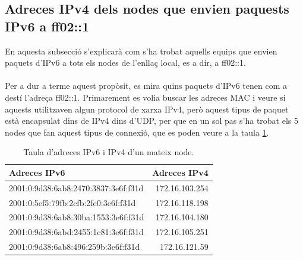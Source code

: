 \documentclass{article}
\begin{document}
\subsection{Adreces IPv4 dels nodes que envien paquests IPv6 a ff02::1}
En aquesta subsecció s'explicarà com s'ha trobat aquells equips que envien
paquets d'IPv6 a tots els nodes de l'enllaç local, es a dir, a ff02::1.\\
\\
Per a dur a terme aquest propòsit, es mira quins paquets d'IPv6 tenen com
a destí l'adreça ff02::1. Primarement es volia buscar les adreces MAC i veure
si aquests utilitzaven algun protocol de xarxa IPv4, però aquest tipus de paquet
està encapsulat dins de IPv4 dins d'UDP, per que en un sol pas s'ha trobat els
5 nodes que fan aquest tipus de connexió, que es poden veure a la taula \ref{ipv6}.
\begin{table}[!h]
\centering
\begin{tabular}{|l|r|}
\hline
Adreces IPv6 &Adreces IPv4\\
\hline
2001:0:9d38:6ab8:2470:3837:3e6f:f31d &172.16.103.254\\
\hline
2001:0:5ef5:79fb:2cfb:2fe0:3e6f:f31d &172.16.118.198\\
\hline
2001:0:9d38:6ab8:30ba:1553:3e6f:f31d &172.16.104.180\\
\hline
2001:0:9d38:6abd:2455:1c81:3e6f:f31d &172.16.105.251\\
\hline
2001:0:9d38:6ab8:496:259b:3e6f:f31d &172.16.121.59\\
\hline
\end{tabular}
\caption{Taula d'adreces IPv6 i IPv4 d'un mateix node.}
\label{ipv6}
\end{table}
\end{document}

